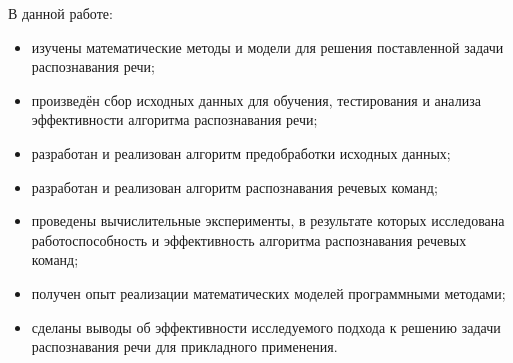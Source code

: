 В данной работе:
\begin{itemize}[leftmargin=2cm]
\item изучены математические методы и модели для решения поставленной задачи распознавания речи;
\item произведён сбор исходных данных для обучения, тестирования и анализа эффективности алгоритма распознавания речи;
\item разработан и реализован алгоритм предобработки исходных данных;
\item разработан и реализован алгоритм распознавания речевых команд;
\item проведены вычислительные эксперименты, в результате которых исследована работоспособность и эффективность алгоритма распознавания речевых команд;
\item получен опыт реализации математических моделей программными методами;
\item сделаны выводы об эффективности исследуемого подхода к решению задачи распознавания речи для прикладного применения.
\end{itemize}